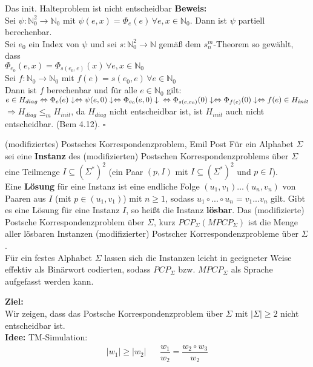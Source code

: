 \begin{satz}{Das init. Halteproblem ist nicht entscheidbar}
    \textbf{Beweis:}\\
    Sei $\psi : \mathbb{N}_0^2 \rightarrow \mathbb{N}_0$ mit $\psi(e,x) = \Phi_e(e) \, \forall e,x \in \mathbb{N}_0$. Dann ist $\psi$ partiell berechenbar. \\
    Sei $e_0$ ein Index von $\psi$ und sei $s:\mathbb{N}_0^2 \rightarrow \mathbb{N}$ gemäß dem $s^m_n$-Theorem so gewählt, 
    dass \\ $\Phi_{e_0}(e,x) = \Phi_{s(e_0,e)}(x) \, \forall e,x \in \mathbb{N}_0$ \\
    Sei $f: \mathbb{N}_0 \rightarrow \mathbb{N}_0$ mit $f(e) = s(e_0,e) \, \forall e\in \mathbb{N}_0$ \\

    Dann ist $f$ berechenbar und für alle $e \in \mathbb{N}_0$ gilt:\\
    $e \in H_{diag} \Leftrightarrow \Phi_e(e)\downarrow \Leftrightarrow \psi(e,0)\downarrow \Leftrightarrow \Phi_{e_0}(e,0)\downarrow \\
    \Leftrightarrow \Phi_{s(e,e_0)}(0)\downarrow \Leftrightarrow \Phi_{f(e)}(0)\downarrow \Leftrightarrow f(e) \in H_{init}$ \\

    $\Rightarrow H_{diag} \leq_m H_{init}$, da $H_{diag}$ nicht entscheidbar ist, ist $H_{init}$ auch nicht entscheidbar. (Bem 4.12). $\square$
\end{satz}

\begin{defn}{(modifiziertes) Postsches Korrespondenzproblem, Emil Post}
    Für ein Alphabet $\Sigma$ sei eine \textbf{Instanz} des (modifizierten) Postschen Korrespondenzproblems über $\Sigma$ eine Teilmenge $I \subseteq (\Sigma^*)^2$ 
    (ein Paar $(p, I)$ mit $I \subseteq (\Sigma^*)^2$ und $p \in I$). \\

    Eine \textbf{Lösung} für eine Instanz ist eine endliche Folge $(u_1,v_1)...(u_n,v_n)$ von Paaren aus $I$ (mit $p \in (u_1,v_1)$) mit $n \geq 1$, sodass
    $u_1 \circ ... \circ u_n = v_1...v_n$ gilt. Gibt es eine Lösung für eine Instanz $I$, so heißt die Instanz \textbf{lösbar}. Das (modifizierte) Postsche 
    Korrespondenzproblem über $\Sigma$, kurz $PCP_\Sigma (MPCP_\Sigma)$ ist die Menge aller lösbaren Instanzen (modifizierter) Postscher Korrespondenzprobleme 
    über $\Sigma$. \\

    Für ein festes Alphabet $\Sigma$ lassen sich die Instanzen leicht in geeigneter Weise effektiv als Binärwort codierten, sodass $PCP_\Sigma$ bzw. $MPCP_\Sigma$ 
    als Sprache aufgefasst werden kann.
\end{defn}

\textbf{Ziel:} \\
Wir zeigen, dass das Postsche Korrespondenzproblem über $\Sigma$ mit $|\Sigma| \geq 2$ nicht entscheidbar ist. \\

\textbf{Idee:} TM-Simulation: \\
\begin{align*}
    |w_1| \geq |w_2| && \dfrac{w_1}{w_2} = \dfrac{w_2 \circ w_3}{w_2} \\
\end{align*}
